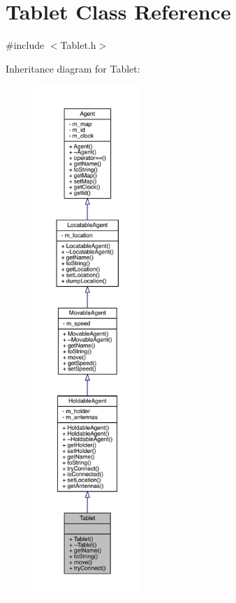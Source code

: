 \hypertarget{class_tablet}{}\section{Tablet Class Reference}
\label{class_tablet}


{\ttfamily \#include $<$Tablet.\+h$>$}



Inheritance diagram for Tablet\+:
\nopagebreak
\begin{figure}[H]
\begin{center}
\leavevmode
\includegraphics[height=550pt]{class_tablet__inherit__graph}
\end{center}
\end{figure}


